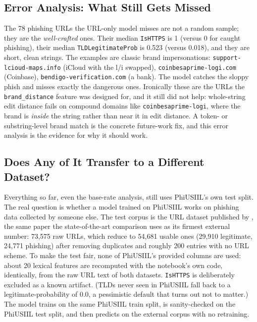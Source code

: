 \documentclass[stu,12pt,floatsintext]{apa7}
\newcommand{\code}[1]{\texttt{#1}}
\begin{document}
\subsection{Error Analysis: What Still Gets Missed}

The 78 phishing URLs the URL-only model misses are not a random sample;
they are the \emph{well-crafted} ones. Their median \code{IsHTTPS} is 1
(versus 0 for caught phishing), their median \code{TLDLegitimateProb} is
0.523 (versus 0.018), and they are short, clean strings. The examples are
classic brand impersonations: \code{support-lcioud-maps.info} (iCloud
with the l/i swapped), \code{coinbesaprime-logi.com} (Coinbase),
\code{bendigo-verification.com} (a bank). The model catches the sloppy
phish and misses exactly the dangerous ones. Ironically these are the
URLs the \code{brand\_distance} feature was designed for, and it still
did not help: whole-string edit distance fails on compound domains like
\code{coinbesaprime-logi}, where the brand is \emph{inside} the string
rather than near it in edit distance. A token- or substring-level brand
match is the concrete future-work fix, and this error analysis is the
evidence for why it should work.

\subsection{Does Any of It Transfer to a Different Dataset?}

Everything so far, even the base-rate analysis, still uses PhiUSIIL's own
test split. The real question is whether a model trained on PhiUSIIL
works on phishing data collected by someone else. The test corpus is the
URL dataset published by \textcite{sahingoz2019}, the same paper the
state-of-the-art comparison uses as its firmest external number: 73{,}575
raw URLs, which reduce to 54{,}681 usable ones (29{,}910 legitimate,
24{,}771 phishing) after removing duplicates and roughly 200 entries with
no URL scheme. To make the test fair, none of PhiUSIIL's provided columns
are used: about 20 lexical features are recomputed with the notebook's
own code, identically, from the raw URL text of both datasets.
\code{IsHTTPS} is deliberately excluded as a known artifact. (TLDs never
seen in PhiUSIIL fall back to a legitimate-probability of 0.0, a
pessimistic default that turns out not to matter.) The model trains on
the same PhiUSIIL train split, is sanity-checked on the PhiUSIIL test
split, and then predicts on the external corpus with no retraining.
\end{document}
